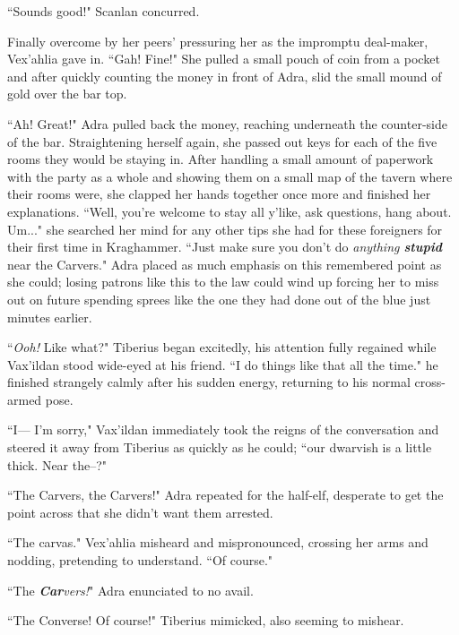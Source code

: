 ``Sounds good!" Scanlan concurred.

Finally overcome by her peers' pressuring her as the impromptu deal-maker, Vex'ahlia gave in. ``Gah! Fine!" She pulled a small pouch of coin from a pocket and after quickly counting the money in front of Adra, slid the small mound of gold over the bar top.

``Ah! Great!" Adra pulled back the money, reaching underneath the counter-side of the bar. Straightening herself again, she passed out keys for each of the five rooms they would be staying in. After handling a small amount of paperwork with the party as a whole and showing them on a small map of the tavern where their rooms were, she clapped her hands together once more and finished her explanations. ``Well, you're welcome to stay all y'like, ask questions, hang about. Um..." she searched her mind for any other tips she had for these foreigners for their first time in Kraghammer. ``Just make sure you don't do \textit{anything \textbf{stupid}} near the Carvers." Adra placed as much emphasis on this remembered point as she could; losing patrons like this to the law could wind up forcing her to miss out on future spending sprees like the one they had done out of the blue just minutes earlier.

``\textit{Ooh!} Like what?" Tiberius began excitedly, his attention fully regained while Vax'ildan stood wide-eyed at his friend. ``I do things like that all the time." he finished strangely calmly after his sudden energy, returning to his normal cross-armed pose.

``I--- I'm sorry," Vax'ildan immediately took the reigns of the conversation and steered it away from Tiberius as quickly as he could; ``our dwarvish is a little thick. Near the--?"

``The Carvers, the Carvers!" Adra repeated for the half-elf, desperate to get the point across that she didn't want them arrested. 

``The carvas." Vex'ahlia misheard and mispronounced, crossing her arms and nodding, pretending to understand. ``Of course."

``The \textit{\textbf{Car}vers!}" Adra enunciated to no avail.

``The Converse! Of course!" Tiberius mimicked, also seeming to mishear.

\newpage


